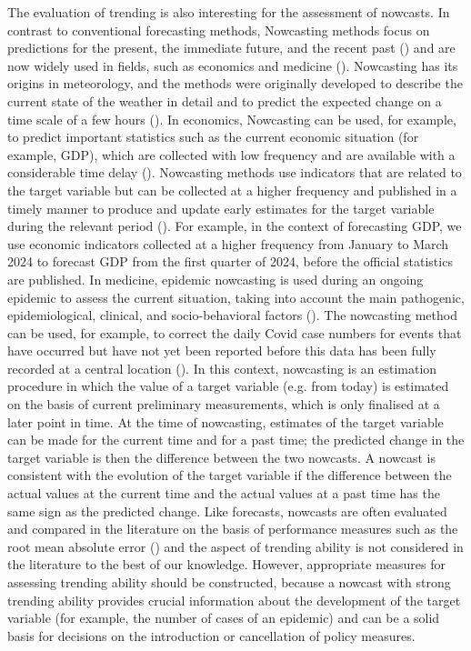 The evaluation of trending is also interesting for the assessment of nowcasts.
In contrast to conventional forecasting methods, Nowcasting methods focus on predictions for the present, the immediate future, and the recent past (\cite{banbura2013now}) and are now widely used in fields, such as economics and medicine (\cite{bok2018macroeconomic, wolffram2023collaborative}).
Nowcasting has its origins in meteorology, and the methods were originally developed to describe the current state of the weather in detail and to predict the expected change on a time scale of a few hours (\cite{browning1989nowcasting,schmid2019nowcasting}). In economics, Nowcasting can be used, for example, to predict important statistics such as the current economic situation (for example, GDP), which are collected with low frequency and are available with a considerable time delay (\cite{banbura2013now}).
Nowcasting methods use indicators that are related to the target variable but can be collected at a higher frequency and published in a timely manner to produce and update early estimates for the target variable during the relevant period (\cite{castle2017forecasting}). For example, in the context of forecasting GDP, we use economic indicators collected at a higher frequency from January to March 2024 to forecast GDP from the first quarter of 2024, before the official statistics are published.
In medicine, epidemic nowcasting is used during an ongoing epidemic to assess the current situation, taking into account the main pathogenic, epidemiological, clinical, and socio-behavioral factors (\cite{wu2021nowcasting}). 
The nowcasting method can be used, for example, to correct the daily Covid case numbers for events that have occurred but have not yet been reported before this data has been fully recorded at a central location (\cite{gunther2021nowcasting}). 
In this context, nowcasting is an estimation procedure in which the value of a target variable (e.g. from today) is estimated on the basis of current preliminary measurements, which is only finalised at a later point in time. 
At the time of nowcasting, estimates of the target variable can be made for the current time and for a past time; the predicted change in the target variable is then the difference between the two nowcasts.  A nowcast is consistent with the evolution of the target variable if the difference between the actual values at the current time and the actual values at a past time has the same sign as the predicted change. Like forecasts, nowcasts are often evaluated and compared in the literature on the basis of performance measures such as the root mean absolute error (\cite{gunther2021nowcasting}) and the aspect of trending ability is not considered in the literature to the best of our knowledge. However, appropriate measures for assessing trending ability should be constructed, because a nowcast with strong trending ability provides crucial information about the development of the target variable (for example, the number of cases of an epidemic) and can be a solid basis for decisions on the introduction or cancellation of policy measures.


